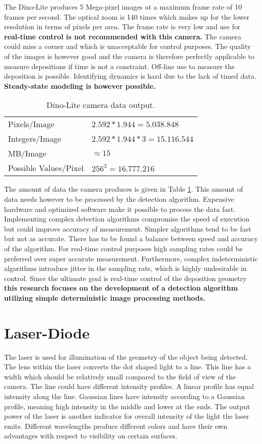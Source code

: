\skippar
The Dino-Lite produces 5 Mega-pixel images at a maximum frame rate of 10 frames per second. The optical zoom is 140 times which makes up for the lower resolution in terms of pixels per area. The frame rate is very low and use for \textbf{real-time control is not recommended with this camera.} The camera could miss a corner and which is unacceptable for control purposes. The quality of the images is however good and the camera is therefore perfectly applicable to measure depositions if time is not a constraint. Off-line use to measure the deposition is possible. Identifying dynamics is hard due to the lack of timed data. \textbf{Steady-state modeling is however possible.}
\begin{table}[!ht]
\centering
\begin{tabular}{ll} \hline \hline
Pixels/Image & $2.592 * 1.944 = 5.038.848$  \\
Integers/Image & $2.592 * 1.944 * 3 = 15.116.544$\\
MB/Image & $\approx15$ \\ 
Possible Values/Pixel & $256^3 = 16.777.216$\\ \hline
\end{tabular}
\caption{ Dino-Lite camera data output.}
\label{tab:camera_output}
\end{table}%
\skippar
The amount of data the camera produces is given in Table \ref{tab:camera_output}. This amount of data needs however to be processed by the detection algorithm. Expensive hardware and optimized software make it possible to process the data fast. Implementing complex detection algorithms compromise the speed of execution but could improve accuracy of measurement. Simpler algorithms tend to be fast but not as accurate. There has to be found a balance between speed and accuracy of the algorithm. For real-time control purposes high sampling rates could be preferred over super accurate measurement. Furthermore, complex indeterministic algorithms introduce jitter in the sampling rate, which is highly undesirable in control. Since the ultimate goal is real-time control of the deposition geometry \textbf{this research focuses on the development of a detection algorithm utilizing simple deterministic image processing methods.} 

\section{Laser-Diode}
The laser is used for illumination of the geometry of the object being detected. The lens within the laser converts the dot shaped light to a line. This line has a width which should be relatively small compared to the field of view of the camera. The line could have different intensity profiles.  A linear profile has equal intensity along the line. Gaussian lines have intensity according to a Gaussian profile, meaning high intensity in the middle and lower at the ends. The output power of the laser is another indicator for overall intensity of the light the laser emits. Different wavelengths produce different colors and have their own advantages with respect to visibility on certain surfaces. 

